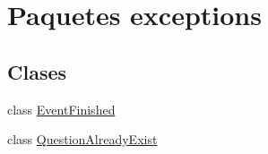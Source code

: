 \hypertarget{namespaceexceptions}{}\section{Paquetes exceptions}
\label{namespaceexceptions}
\subsection*{Clases}
\begin{DoxyCompactItemize}
\item 
class \mbox{\hyperlink{classexceptions_1_1EventFinished}{Event\+Finished}}
\item 
class \mbox{\hyperlink{classexceptions_1_1QuestionAlreadyExist}{Question\+Already\+Exist}}
\end{DoxyCompactItemize}
